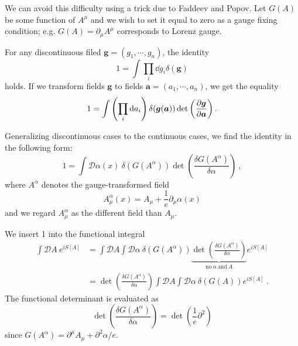 \documentclass[a4paper,pdftex]{article}
\begin{document}
We can avoid this difficulty using a trick due to Faddeev and Popov. Let $G(A)$ be some function of $A^{\mu}$ and we wish to set it equal to zero as a gauge fixing condition; e.g. $G(A)=\partial_{\mu}A^{\mu}$ corresponds to Lorenz gauge. 

For any discontinuous filed $\bm{g}=(g_{1},\cdots,g_{n})$, the identity
\begin{equation}
  1
  =
  \int \prod_{i}\dd g_{i}
  \delta(\bm{g})
\end{equation} 
holds. If we transform fields $\bm{g}$ to fields $\bm{a}=(a_{1},\cdots,a_{n})$, we get the equality
\begin{equation}
  1
  =
  \int\left( \prod_{i}\dd a_{i} \right)
  \delta(\bm{g}(\bm{a}))\det\left( \pdv{\bm{g}}{\bm{a}} \right)
  .
\end{equation}

Generalizing discontinuous cases to the continuous cases, we find the identity in the following form:
\begin{equation}
  1
  =
  \int\mathcal{D}\alpha(x)\ 
  \delta(G(A^{\alpha}))
  \det\left( \frac{\delta G(A^{\alpha})}{\delta\alpha} \right)
  \ ,
\end{equation}
where $A^{\alpha}$ denotes the gauge-transformed field
\begin{equation}
  A_{\mu}^{\alpha}(x)
  =
  A_{\mu}
  +
  \frac{1}{e}\partial_{\mu}\alpha(x)
\end{equation}
and we regard $A^{\alpha}_{\mu}$ as the different field than $A_{\mu}$.

We insert 1 into the functional integral
\begin{align}
  \int\mathcal{D}A\ e^{iS[A]}
  &=
  \int\mathcal{D}A\int\mathcal{D}\alpha\ 
  \delta(G(A^{\alpha}))
  \underbrace{\det\left( \frac{\delta G(A^{\alpha})}{\delta \alpha} \right)}_{\text{no}\ \alpha\ \text{and}\ A}e^{iS[A]}
  \nonumber
  \\
  &=
  \det\left( \frac{\delta G(A^{\alpha})}{\delta \alpha} \right)
  \int\mathcal{D}A\int\mathcal{D}\alpha\ 
  \delta(G(A))e^{iS[A]}
  \ .
\end{align}
The functional determinant is evaluated as
\begin{equation}
  \det\left( \frac{\delta G(A^{\alpha})}{\delta \alpha} \right)
  =
  \det\left( \frac{1}{e}\partial^2 \right)
\end{equation}
since $G(A^{\alpha})=\partial^{\mu}A_{\mu}+\partial^2\alpha/e$. 
\end{document}
